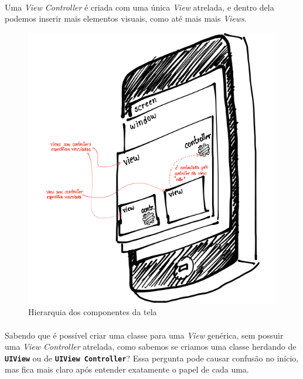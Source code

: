 \documentclass[a4paper,12pt,brazil,doubleside]{book}
\begin{document}
\paragraph{}Uma \emph{View Controller} é criada com uma única \emph{View} atrelada, e dentro dela podemos inserir mais elementos visuais, como até mais mais \emph{Views}.

\pagebreak

\begin{figure}[h]
  \centering
  \includegraphics[totalheight=0.55\textheight]{figuras/screen_hierarchy.png}
  \caption{Hierarquia dos componentes da tela}
  \label{fig:a}
\end{figure}

\paragraph{}Sabendo que é possível criar uma classe para uma \emph{View} genérica, sem possuir uma \emph{View Controller} atrelada, como sabemos se criamos uma classe herdando de \texttt{\textbf{UIView}} ou de \texttt{\textbf{UIView Controller}}? Essa pergunta pode causar confusão no início, mas fica mais claro após entender exatamente o papel de cada uma.
\end{document}
